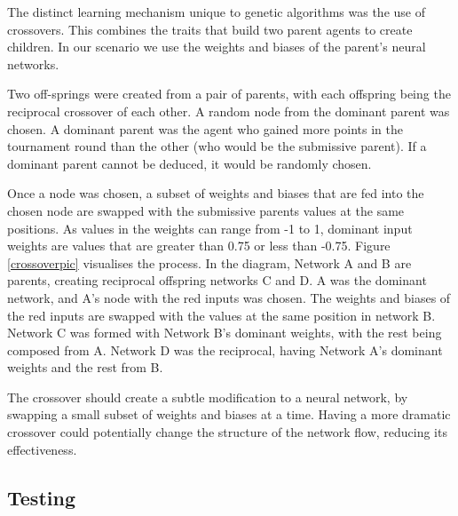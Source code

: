 \documentclass[12pt,a4paper]{article}
\begin{document}
            The distinct learning mechanism unique to genetic algorithms was the use of crossovers. This combines the traits that build two parent agents to create children. In our scenario we use the weights and biases of the parent's neural networks.

            Two off-springs were created from a pair of parents, with each offspring being the reciprocal crossover of each other. 
            A random node from the dominant parent was chosen. A dominant parent was the agent who gained more points in the tournament round than the other (who would be the submissive parent). If a dominant parent cannot be deduced, it would be randomly chosen. 

            Once a node was chosen, a subset of weights and biases that are fed into the chosen node are swapped with the submissive parents values at the same positions. As values in the weights can range from -1 to 1, dominant input weights are values that are greater than 0.75 or less than -0.75. Figure \ref{crossoverpic} visualises the process. In the diagram, Network A and B are parents, creating reciprocal offspring networks C and D. A was the dominant network, and A's node with the red inputs was chosen. The weights and biases of the red inputs are swapped with the values at the same position in network B. Network C was formed with Network B's dominant weights, with the rest being composed from A. Network D was the reciprocal, having Network A's dominant weights and the rest from B.

            The crossover should create a subtle modification to a neural network, by swapping a small subset of weights and biases at a time. Having a more dramatic crossover could potentially change the structure of the network flow, reducing its effectiveness. 
            

    \subsection{Testing}
\end{document}
